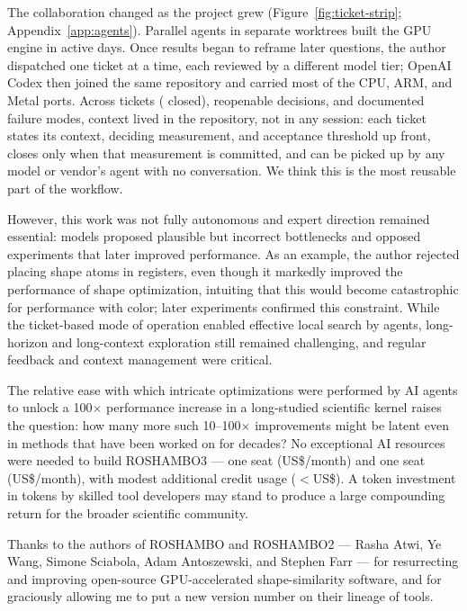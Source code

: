 \documentclass{article}
\begin{document}
The collaboration changed as the project grew (Figure~\ref{fig:ticket-strip}; Appendix~\ref{app:agents}).
Parallel agents in separate worktrees built the GPU engine in
\AugustActiveDays{} active days. Once results began to reframe later questions,
the author dispatched one ticket at a time, each reviewed by a different model
tier; OpenAI Codex then joined the same repository and carried most of the CPU,
ARM, and Metal ports. Across \TicketCount{} tickets (\ClosedTicketCount{}
closed), \DecisionCount{} reopenable decisions, and \PitfallCount{} documented
failure modes, context lived in the repository, not in any session: each ticket
states its context, deciding measurement, and acceptance threshold up front,
closes only when that measurement is committed, and can be picked up by any
model or vendor's agent with no conversation. We think this is the most
reusable part of the workflow.

However, this work was not fully autonomous and expert direction remained essential: models proposed plausible but incorrect
bottlenecks and opposed experiments that later improved performance. As an example, the author rejected placing shape atoms in registers, even though it markedly improved the performance of shape optimization, intuiting that this would  become catastrophic for performance with color; later experiments confirmed this constraint. While the ticket-based mode of operation enabled effective local search by agents, long-horizon and long-context exploration still remained challenging, and regular feedback and context management were critical.

The relative ease with which intricate optimizations were performed by AI agents to unlock a 100$\times$
performance increase in a long-studied scientific kernel raises the question:
how many more such 10--100$\times$ improvements might be latent even in methods that have been worked on
for decades? No exceptional AI resources were needed to build ROSHAMBO3 --- one \ClaudePlan{} seat
(US\$\ClaudePlanUsdPerMonth/month) and one \ChatgptPlan{} seat (US\$\ChatgptPlanUsdPerMonth/month),
with modest additional credit usage ($<$US\$\AdditionalCreditUsdBelow). A token investment in tokens
by skilled tool developers may stand to produce a large compounding return for 
the broader scientific community.

\begin{ack}
Thanks to the authors of ROSHAMBO and ROSHAMBO2 --- Rasha Atwi, Ye Wang, Simone Sciabola, Adam Antoszewski, and Stephen Farr --- for resurrecting and improving
open-source GPU-accelerated shape-similarity software, and for graciously allowing me to put a new version number
on their lineage of tools.
\end{ack}

\clearpage


\appendix
\newpage

\end{document}
